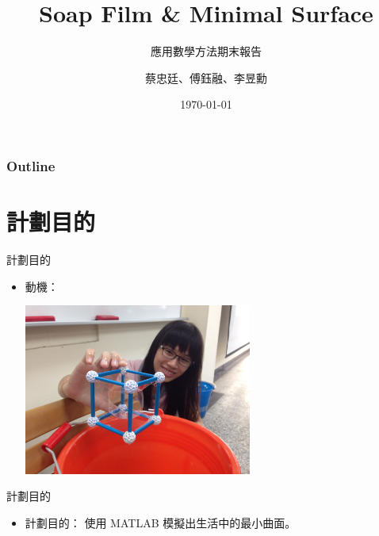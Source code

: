 \documentclass[11pt]{beamer}
\title{Soap Film \& Minimal Surface}
\subtitle{應用數學方法期末報告}
\author{蔡忠廷、傅鈺融、李昱勳}
\institute{Dept. of Math, NCKU, Tainan}
\date{\today}
\begin{document}
\noindent
\frame{\titlepage}
\begin{frame}
  \frametitle{Outline}
  \tableofcontents
\end{frame}

\section{計劃目的}

\begin{frame}{計劃目的}
\begin{itemize}
\item 動機：
\begin{center}
\includegraphics[width=7.5cm]{IMG_3854}
\end{center}

\end{itemize}

\end{frame}
\begin{frame}{計劃目的}
\begin{itemize}
\item 計劃目的：
使用 MATLAB 模擬出生活中的最小曲面。

\end{itemize}
\end{frame}
\end{document}
